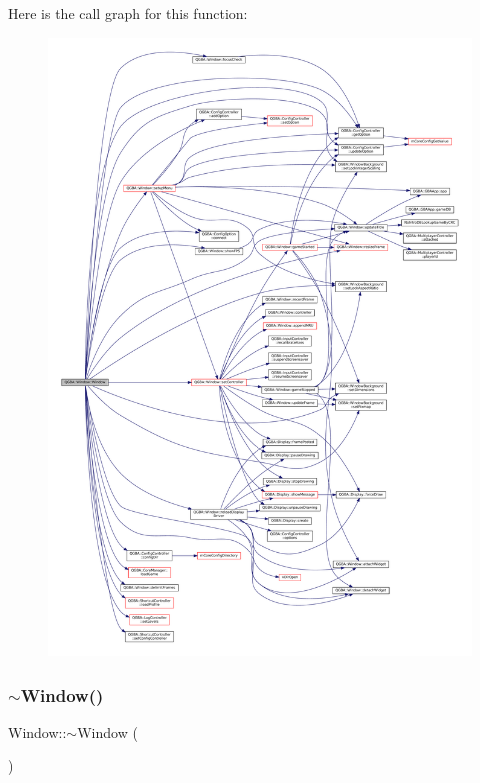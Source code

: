 Here is the call graph for this function\+:
\nopagebreak
\begin{figure}[H]
\begin{center}
\leavevmode
\includegraphics[width=350pt]{class_q_g_b_a_1_1_window_ad0f32ffced44b9d2f3121927a7d7634d_cgraph}
\end{center}
\end{figure}
\mbox{\label{class_q_g_b_a_1_1_window_a245d821e6016fa1f6970ccbbedd635f6}} 
\subsubsection{\texorpdfstring{$\sim$\+Window()}{~Window()}}
{\footnotesize\ttfamily Window\+::$\sim$\+Window (\begin{DoxyParamCaption}{ }\end{DoxyParamCaption})\hspace{0.3cm}{\ttfamily [virtual]}}



